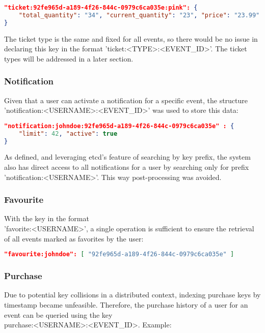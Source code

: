 \documentclass[screen,review]{acmart}
\begin{document}
\begin{lstlisting}[language=json]
"ticket:92fe965d-a189-4f26-844c-0979c6ca035e:pink": {
    "total_quantity": "34", "current_quantity": "23", "price": "23.99"
}
\end{lstlisting}

The ticket type is the same and fixed for all events, so there would be no issue in declaring this key in the format 'ticket:<TYPE>:<EVENT\_ID>'. The ticket types will be addressed in a later section.

\subsubsection{Notification}
Given that a user can activate a notification for a specific event, the structure \\ 'notification:<USERNAME>:<EVENT\_ID>' was used to store this data:

\begin{lstlisting}[language=json]
"notification:johndoe:92fe965d-a189-4f26-844c-0979c6ca035e" : {
    "limit": 42, "active": true
}
\end{lstlisting}

As defined, and leveraging etcd's feature of searching by key prefix, the system also has direct access to all notifications for a user by searching only for prefix 'notification:<USERNAME>'. This way post-processing was avoided.

\subsubsection{Favourite}
With the key in the format \\ 'favorite:<USERNAME>', a single operation is sufficient to ensure the retrieval of all events marked as favorites by the user:

\begin{lstlisting}[language=json]
"favourite:johndoe": [ "92fe965d-a189-4f26-844c-0979c6ca035e" ]
\end{lstlisting}

\subsubsection{Purchase}
Due to potential key collisions in a distributed context, indexing purchase keys by timestamp became unfeasible. Therefore, the purchase history of a user for an event can be queried using the key \\ purchase:<USERNAME>:<EVENT\_ID>. Example:
\end{document}
